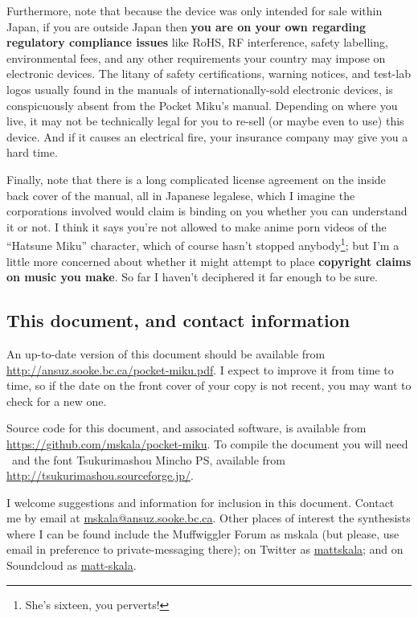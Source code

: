 \documentclass[titlepage]{article}
\begin{document}
Furthermore, note that because the device was only intended for sale within
Japan, if you are outside Japan then \textbf{you are on your own regarding
regulatory compliance issues} like RoHS, RF interference, safety labelling,
environmental fees, and any other requirements your country may impose on
electronic devices.  The litany of safety certifications, warning notices,
and test-lab logos usually found in the manuals of internationally-sold
electronic devices, is conspicuously absent from the Pocket Miku's manual. 
Depending on where you live, it may not be technically legal for you to
re-sell (or maybe even to use) this device.  And if it causes an
electrical fire, your insurance company may give you a hard time.

Finally, note that there is a long complicated license agreement on the
inside back cover of the manual, all in Japanese legalese, which I imagine
the corporations involved would claim is binding on you whether you can
understand it or not.  I think it says you're not allowed to make anime
porn videos of the ``Hatsune Miku'' character, which of course hasn't
stopped anybody\footnote{She's sixteen, you perverts!}; but I'm a little
more concerned about whether it might attempt to place \textbf{copyright
claims on music you make}.  So far I haven't deciphered it far enough to be
sure.

\subsection{This document, and contact information}

An up-to-date version of this document should be available from
\url{http://ansuz.sooke.bc.ca/pocket-miku.pdf}.  I expect to improve it from
time to time, so if the date on the front cover of your copy is not recent,
you may want to check for a new one.

Source code for this document, and associated software, is available from
\url{https://github.com/mskala/pocket-miku}.  To compile the document you
will need \XeTeX\ and the font {\mincho Tsukurimashou Mincho PS}, available
from \url{http://tsukurimashou.sourceforge.jp/}.

I welcome suggestions and information for inclusion in this document. 
Contact me by email at
\href{mailto:mskala@ansuz.sooke.bc.ca}{mskala@ansuz.sooke.bc.ca}.  Other
places of interest the synthesists where I can be found include the
Muffwiggler Forum as mskala (but please, use email in preference to
private-messaging there); on Twitter as
\href{https://twitter.com/mattskala}{mattskala}; and on Soundcloud as
\href{https://soundcloud.com/matt-skala}{matt-skala}.
\end{document}
